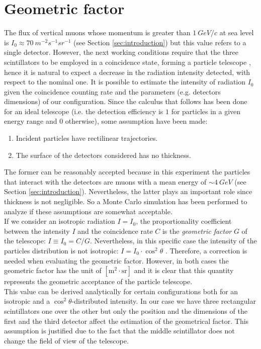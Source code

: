 \section{Geometric factor} \label{sec:geometric factor}

The flux of vertical muons whose momentum is greater than $\SI{1}{GeV/c}$ at sea level is $ I_0 \approx 70 \ \si{m^{-2}} \si{s^{-1}} \si{sr^{-1}}$ (see Section \ref{sec:introduction}) but this value refers to a single detector. However, the next working conditions require that the three scintillators to be employed in a coincidence state, forming a particle telescope \cite{Sullivan}, hence it is natural to expect a decrease in the radiation intensity detected, with respect to the nominal one. It is possible to estimate the intensity of radiation $I_0$ given the coincidence counting rate and the parameters (e.g. detectors dimensions) of our configuration. Since the calculus that follows has been done for an ideal telescope (i.e. the detection efficiency is $1$ for particles in a given energy range and $0$ otherwise), some assumption have been made: 
\begin{enumerate}
	\item Incident particles have rectilinear trajectories.
	\item The surface of the detectors considered has no thickness.
\end{enumerate}
The former can be reasonably accepted because in this experiment the particles that interact with the detectors are muons with a mean energy of $\sim \SI{4}{GeV}$ (see Section \ref{sec:introduction}). Nevertheless, the latter plays an important role since thickness is not negligible. So a Monte Carlo simulation has been performed to analyze if these assumptions are somewhat acceptable.\\
\indent If we consider an isotropic radiation $I=I_0$, the proportionality coefficient between the intensity $I$ and the coincidence rate $C$ is the \emph{geometric factor} $G$ of the telescope: $I\equiv I_0 = C/G$. Nevertheless, in this specific case the intensity of the particles distribution is not isotropic: $I = I_0\cdot \cos^2\theta$ \cite{PDG}. Therefore, a correction is needed when evaluating the geometric factor. However, in both cases the geometric factor has the unit of $\left[ \si{\meter}^{2}\cdot \si{\steradian}\right] $ and it is clear that this quantity represents the geometric acceptance of the particle telescope.\\
This value can be derived analytically for certain configurations \cite{Thomas} both for an isotropic and a $\cos^2\theta$-distributed intensity. In our case we have three rectangular scintillators one over the other but only the position and the dimensions of the first and the third detector affect the estimation of the geometrical factor. This assumption is justified due to the fact that the middle scintillator does not change the field of view of the telescope.
